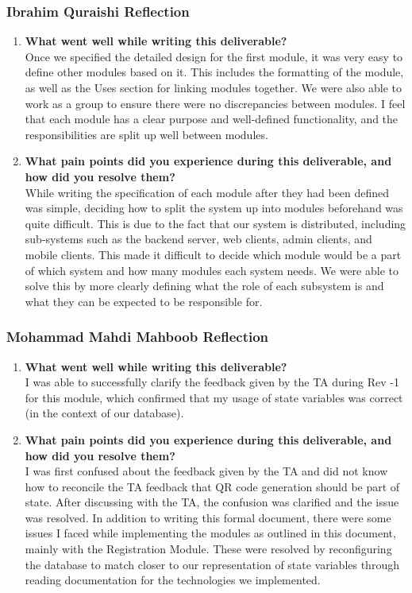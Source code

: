 \documentclass[12pt, titlepage]{article}
\begin{document}
\subsubsection*{Ibrahim Quraishi Reflection}
\begin{enumerate}
  \item \textbf{What went well while writing this deliverable?} \\
  Once we specified the detailed design for the first module, it was very easy to define other modules based on it. This includes the formatting of the module, as well as the Uses section for linking modules together. We were also able to work as a group to ensure there were no discrepancies between modules. I feel that each module has a clear purpose and well-defined functionality, and the responsibilities are split up well between modules.

  \item \textbf{What pain points did you experience during this deliverable, and how did you resolve them?} \\
  While writing the specification of each module after they had been defined was simple, deciding how to split the system up into modules beforehand was quite difficult. This is due to the fact that our system is distributed, including sub-systems such as the backend server, web clients, admin clients, and mobile clients. This made it difficult to decide which module would be a part of which system and how many modules each system needs. We were able to solve this by more clearly defining what the role of each subsystem is and what they can be expected to be responsible for.
\end{enumerate}

\subsubsection*{Mohammad Mahdi Mahboob Reflection}
\begin{enumerate}
  \item \textbf{What went well while writing this deliverable?} \\
    I was able to successfully clarify the feedback given by the TA during Rev -1 for this module, which confirmed that
    my usage of state variables was correct (in the context of our database).

  \item \textbf{What pain points did you experience during this deliverable, and how did you resolve them?} \\
    I was first confused about the feedback given by the TA and did not know how to reconcile the TA feedback that QR
    code generation should be part of state. After discussing with the TA, the confusion was clarified and the issue was
    resolved. In addition to writing this formal document, there were some issues I faced while implementing the
    modules as outlined in this document, mainly with the Registration Module. These were resolved by reconfiguring the
    database to match closer to our representation of state variables through reading documentation for the technologies
    we implemented.


\end{enumerate}
\end{document}
